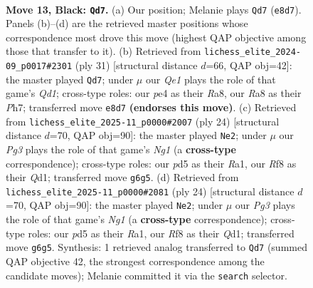 \documentclass[11pt]{article}
\begin{document}
\clearpage

\begin{figure}[p]\centering
\begin{subfigure}{0.46\textwidth}\centering
\resizebox{\linewidth}{!}{%
\newchessgame
\chessboard[
  setfen={rn2qrk1/p1p1pp1p/5bp1/3P4/2Q1P3/B1P4P/P4P1P/R3K2R b KQ - 0 13},
  showmover=false,
  pgfstyle=straightmove, color=movearrow, markmove={e8-d7}
]}
\caption{}
\end{subfigure}\hfill
\begin{subfigure}{0.46\textwidth}\centering
\resizebox{\linewidth}{!}{%
\newchessgame
\chessboard[
  setfen={r2q1rk1/5ppp/p2p1n2/1p6/8/1QPP1P2/PP3P1P/R1B1R1K1 b - - 0 16},
  showmover=false,
  pgfstyle=straightmove, color=movearrow, markmove={d8-d7}
]}
\caption{}
\end{subfigure}
\\[4pt]
\begin{subfigure}{0.46\textwidth}\centering
\resizebox{\linewidth}{!}{%
\newchessgame
\chessboard[
  setfen={r1b1k2r/pp1n1ppp/q7/8/2pPB3/4P1P1/P4P1P/R2QK1NR w KQkq - 1 13},
  showmover=false,
  pgfstyle=straightmove, color=movearrow, markmove={g1-e2}
]}
\caption{}
\end{subfigure}\hfill
\begin{subfigure}{0.46\textwidth}\centering
\resizebox{\linewidth}{!}{%
\newchessgame
\chessboard[
  setfen={r1b1k2r/pp1n1ppp/q7/8/2pPB3/4P1P1/P4P1P/R2QK1NR w KQkq - 1 13},
  showmover=false,
  pgfstyle=straightmove, color=movearrow, markmove={g1-e2}
]}
\caption{}
\end{subfigure}
\caption{\textbf{Move 13, Black: \texttt{Qd7}.} (a) Our position; Melanie plays \texttt{Qd7} (\texttt{e8d7}). Panels (b)--(d) are the retrieved master positions whose correspondence most drove this move (highest QAP objective among those that transfer to it). (b) Retrieved from \texttt{lichess\_elite\_2024-09\_p0017\#2301} (ply 31) [structural distance $d$=66, QAP obj=42]: the master played \texttt{Qd7}; under $\mu$ our \emph{Qe1} plays the role of that game's \emph{Qd1}; cross-type roles: our \emph{p}e4 as their \emph{R}a8, our \emph{R}a8 as their \emph{P}h7; transferred move \texttt{e8d7} \textbf{(endorses this move)}. (c) Retrieved from \texttt{lichess\_elite\_2025-11\_p0000\#2007} (ply 24) [structural distance $d$=70, QAP obj=90]: the master played \texttt{Ne2}; under $\mu$ our \emph{Pg3} plays the role of that game's \emph{Ng1} (a \textbf{cross-type} correspondence); cross-type roles: our \emph{p}d5 as their \emph{R}a1, our \emph{R}f8 as their \emph{Q}d1; transferred move \texttt{g6g5}. (d) Retrieved from \texttt{lichess\_elite\_2025-11\_p0000\#2081} (ply 24) [structural distance $d$=70, QAP obj=90]: the master played \texttt{Ne2}; under $\mu$ our \emph{Pg3} plays the role of that game's \emph{Ng1} (a \textbf{cross-type} correspondence); cross-type roles: our \emph{p}d5 as their \emph{R}a1, our \emph{R}f8 as their \emph{Q}d1; transferred move \texttt{g6g5}. Synthesis: 1 retrieved analog transferred to \texttt{Qd7} (summed QAP objective 42, the strongest correspondence among the candidate moves); Melanie committed it via the \texttt{search} selector.}
\label{fig:thought-m25}
\end{figure}
\end{document}
